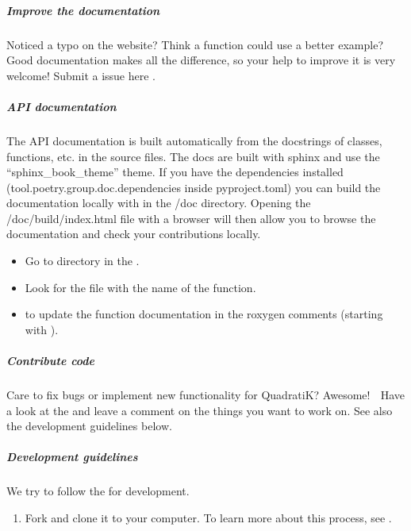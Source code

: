 \documentclass[letterpaper,10pt,english,openany,oneside]{sphinxmanual}
\begin{document}
{{{{\subparagraph{Improve the documentation 📖}
\label{\detokenize{development/CONTRIBUTING:improve-the-documentation}}
\sphinxAtStartPar
Noticed a typo on the website? Think a function could use a better example? Good documentation makes all the difference, so your help to improve it is very welcome! Submit a issue here .


\subparagraph{API documentation}
\label{\detokenize{development/CONTRIBUTING:api-documentation}}
\sphinxAtStartPar
The API documentation is built automatically from the docstrings of classes, functions, etc. in the source files. The docs are built with sphinx and use the “sphinx\_book\_theme” theme. If you have the dependencies installed (tool.poetry.group.doc.dependencies inside pyproject.toml) you can build the documentation locally with  in the /doc directory. Opening the /doc/build/index.html file with a browser will then allow you to browse the documentation and check your contributions locally.
\begin{itemize}
\item {} 
\sphinxAtStartPar
Go to  directory in the .

\item {} 
\sphinxAtStartPar
Look for the file with the name of the function.

\item {} 
\sphinxAtStartPar
{} to update the function documentation in the roxygen comments (starting with \sphinxcode{\sphinxupquote{\#\textquotesingle{}}}).

\end{itemize}


\subparagraph{Contribute code 📝}
\label{\detokenize{development/CONTRIBUTING:contribute-code}}
\sphinxAtStartPar
Care to fix bugs or implement new functionality for QuadratiK? Awesome! 👏 Have a look at the  and leave a comment on the things you want to work on. See also the development guidelines below.


\subparagraph{Development guidelines}
\label{\detokenize{development/CONTRIBUTING:development-guidelines}}
\sphinxAtStartPar
We try to follow the  for development.
\begin{enumerate}
%
\item {} 
\sphinxAtStartPar
Fork  and clone it to your computer. To learn more about this process, see .


\end{enumerate}}}}}
\end{document}
